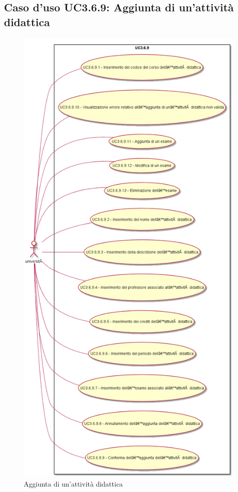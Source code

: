 \subsection{Caso d'uso \texorpdfstring{UC3.6.9}{UC3.6.9}: Aggiunta di un'attività didattica}
\begin{figure} [H]
\centering
\includegraphics[scale=0.45]{./img/UC3-6-9.png}
\caption{Aggiunta di un'attività didattica}\label{}
\end{figure}
